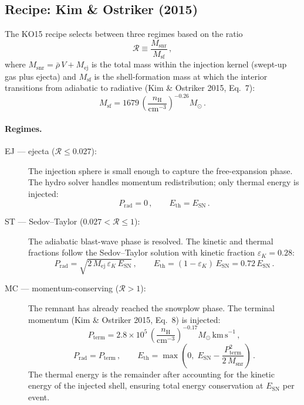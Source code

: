\documentclass[11pt]{article}
\begin{document}
\subsection{Recipe: Kim \& Ostriker (2015)}
\label{sec:ko15}

The KO15 recipe selects between three regimes based on the ratio
\begin{equation}
  \mathcal{R} \equiv \frac{M_\mathrm{snr}}{M_\mathrm{sf}}\,,
\end{equation}
where $M_\mathrm{snr} = \bar{\rho}\,V + M_\mathrm{ej}$ is the total mass
within the injection kernel (swept-up gas plus ejecta) and $M_\mathrm{sf}$ is
the shell-formation mass at which the interior transitions from adiabatic to
radiative (Kim \& Ostriker 2015, Eq.~7):
\begin{equation}
  M_\mathrm{sf} = 1679\,\left(\frac{n_\mathrm{H}}{\mathrm{cm}^{-3}}\right)^{-0.26}
                  M_\odot\,.
\end{equation}

\paragraph{Regimes.}
\begin{description}
  \item[EJ --- ejecta ($\mathcal{R} \leq 0.027$):]
    The injection sphere is small enough to capture the free-expansion phase.
    The hydro solver handles momentum redistribution; only thermal energy is
    injected:
    \begin{equation}
      P_\mathrm{rad} = 0\,, \qquad E_\mathrm{th} = E_\mathrm{SN}\,.
    \end{equation}
  \item[ST --- Sedov--Taylor ($0.027 < \mathcal{R} \leq 1$):]
    The adiabatic blast-wave phase is resolved.  The kinetic and thermal
    fractions follow the Sedov--Taylor solution with kinetic fraction
    $\varepsilon_K = 0.28$:
    \begin{equation}
      P_\mathrm{rad} = \sqrt{2\,M_\mathrm{ej}\,\varepsilon_K\,E_\mathrm{SN}}\,,
      \qquad
      E_\mathrm{th} = (1 - \varepsilon_K)\,E_\mathrm{SN} = 0.72\,E_\mathrm{SN}\,.
    \end{equation}
  \item[MC --- momentum-conserving ($\mathcal{R} > 1$):]
    The remnant has already reached the snowplow phase.  The terminal momentum
    (Kim \& Ostriker 2015, Eq.~8) is injected:
    \begin{equation}
      P_\mathrm{term} = 2.8 \times 10^5\,
        \left(\frac{n_\mathrm{H}}{\mathrm{cm}^{-3}}\right)^{-0.17}
        M_\odot\,\mathrm{km\,s}^{-1}\,,
    \end{equation}
    \begin{equation}
      P_\mathrm{rad} = P_\mathrm{term}\,, \qquad
      E_\mathrm{th} = \max\!\left(0,\; E_\mathrm{SN}
        - \frac{P_\mathrm{term}^2}{2\,M_\mathrm{snr}}\right)\,.
    \end{equation}
    The thermal energy is the remainder after accounting for the kinetic energy
    of the injected shell, ensuring total energy conservation at $E_\mathrm{SN}$
    per event.
\end{description}
\end{document}
